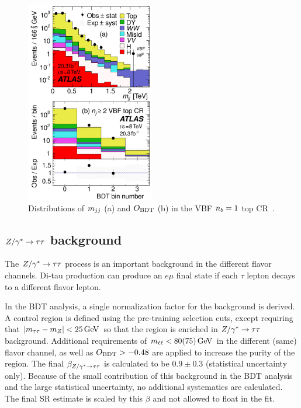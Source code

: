\begin{figure}[h!]
  \centering
  \captionsetup{justification=centering}
  \includegraphics[width=0.5\textwidth]{figures/VBF_topcr}
  \caption{Distributions of $m_{jj}$ (a) and $O_{\rm BDT}$ (b) in the VBF $n_b = 1$ top CR~\cite{WW2015}.}
  \label{fig:vbf_top_cr}
\end{figure}

\subsection{$Z/\gamma^{\ast} \to \tau\tau$ background}

The $Z/\gamma^{\ast} \to \tau\tau$ process is an important background in the different flavor channels. Di-tau production can produce an $e\mu$ final state if each $\tau$ lepton decays to a different flavor lepton. 

In the BDT analysis, a single normalization factor for the background is derived. A control region is defined using the pre-training selection cuts, except requiring that $|\mtt - m_Z| < 25 \GeV$ so that the region is enriched in $Z/\gamma^{\ast} \to \tau\tau$ background. Additional requirements of $\mll < 80 (75) \GeV$ in the different (same) flavor channel, as well as $O_{\rm BDT} > -0.48$ are applied to increase the purity of the region. The final $\beta_{Z/\gamma^{\ast} \to \tau\tau}$ is calculated to be $0.9 \pm 0.3$ (statistical uncertainty only). Because of the small contribution of this background in the BDT analysis and the large statistical uncertainty, no additional systematics are calculated. The final SR estimate is scaled by this $\beta$ and not allowed to float in the fit. 

